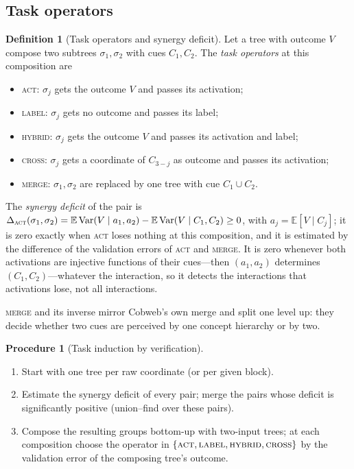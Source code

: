 \documentclass[11pt]{article}
\theoremstyle{definition}
\newtheorem{definition}[theorem]{Definition}
\newtheorem{procedure}[theorem]{Procedure}
\theoremstyle{remark}
\newcommand{\E}{\mathbb{E}}
\newcommand{\Var}{\operatorname{Var}}
\begin{document}
\subsection{Task operators}

\begin{definition}[Task operators and synergy deficit]\label{def:operators}
Let a tree with outcome $V$ compose two subtrees $\sigma_1,\sigma_2$ with cues
$C_1,C_2$.  The \emph{task operators} at this composition are
\begin{itemize}[leftmargin=*,noitemsep]
\item \textsc{act}: $\sigma_j$ gets the outcome $V$ and passes its activation;
\item \textsc{label}: $\sigma_j$ gets no outcome and passes its label;
\item \textsc{hybrid}: $\sigma_j$ gets the outcome $V$ and passes its activation and label;
\item \textsc{cross}: $\sigma_j$ gets a coordinate of $C_{3-j}$ as outcome and passes its
  activation;
\item \textsc{merge}: $\sigma_1,\sigma_2$ are replaced by one tree with cue $C_1\cup C_2$.
\end{itemize}
The \emph{synergy deficit} of the pair is
$\Delta_{\textsc{act}}(\sigma_1,\sigma_2)=\E\Var(V\mid a_1,a_2)-\E\Var(V\mid C_1,C_2)\ge0$,
with $a_j=\E[V\mid C_j]$; it is zero exactly when \textsc{act} loses nothing at this
composition, and it is estimated by the difference of the validation errors of
\textsc{act} and \textsc{merge}.  It is zero whenever both activations are injective
functions of their cues---then $(a_1,a_2)$ determines $(C_1,C_2)$---whatever the
interaction, so it detects the interactions that activations lose, not all
interactions.
\end{definition}

\textsc{merge} and its inverse mirror Cobweb's own merge and split one level up: they
decide whether two cues are perceived by one concept hierarchy or by two.

\begin{procedure}[Task induction by verification]\label{proc:induction}
\leavevmode
\begin{enumerate}[leftmargin=*,noitemsep]
\item Start with one tree per raw coordinate (or per given block).
\item Estimate the synergy deficit of every pair; merge the pairs whose deficit is
  significantly positive (union--find over these pairs).
\item Compose the resulting groups bottom-up with two-input trees; at each composition
  choose the operator in $\{\textsc{act},\textsc{label},\textsc{hybrid},\textsc{cross}\}$
  by the validation error of the composing tree's outcome.
\end{enumerate}
\end{procedure}
\end{document}
